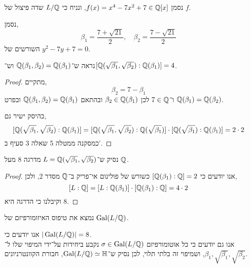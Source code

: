 \question{}
נסמן $f(x) = x^4 - 7x^2 + 7 \in \mathbb{Q}[x]$, ונניח כי $L / \mathbb{Q}$ שדה פיצול של $f$.

\subquestion{}
נסמן,
\[
	\beta_1
	= \frac{7 + \sqrt{21}}{2},
	\quad
	\beta_2
	= \frac{7 - \sqrt{21}}{2}
\]
השורשים של $y^2 - 7y + 7 = 0$.

\subquestion{}
נראה ש־$\mathbb{Q}(\beta_1, \beta_2) = \mathbb{Q}(\beta_1)$ וש־$[\mathbb{Q}(\sqrt{\beta_1}, \sqrt{\beta_2}) : \mathbb{Q}(\beta_1)] = 4$.
\begin{proof}
	מתקיים,
	\[
		\beta_2
		= 7 - \beta_1
	\]
	ו־$7 \in \mathbb{Q}$ לכן $\beta_2 \in \mathbb{Q}(\beta_1)$ ובהתאם $\mathbb{Q}(\beta_1, \beta_2) = \mathbb{Q}(\beta_1)$ ובפרט $\mathbb{Q}(\beta_1) = \mathbb{Q}(\beta_2)$.

	כהיסק ישיר גם,
	\[
		[\mathbb{Q}(\sqrt{\beta_1}, \sqrt{\beta_2}) : \mathbb{Q}(\beta_1)]
		= [\mathbb{Q}(\sqrt{\beta_1}, \sqrt{\beta_2}) : \mathbb{Q}(\sqrt{\beta_1})]
		\cdot [\mathbb{Q}(\sqrt{\beta_1}) : \mathbb{Q}(\beta_1)]
		= 2 \cdot 2
	\]
	כמסקנה ממטלה 5 שאלה 3 סעיף ב'.
\end{proof}

\subquestion{}
נסיק ש־$L = \mathbb{Q}(\sqrt{\beta_1}, \sqrt{\beta_2})$ מדרגה 8 מעל $\mathbb{Q}$.
\begin{proof}
	אנו יודעים כי $[\mathbb{Q}(\beta_1) : \mathbb{Q}] = 2$ כשורש של פולינום אי־פריק ב־$\mathbb{Q}$ מסדר 2, ולכן,
	\[
		[L : \mathbb{Q}]
		= [L : \mathbb{Q}(\beta_1)] \cdot [\mathbb{Q}(\beta_1) : \mathbb{Q}]
		= 4 \cdot 2
	\]
	וקיבלנו כי הדרגה היא $8$.
\end{proof}

\subquestion{}
נמצא את טיפוס האיזומורפיזם של $\operatorname{Gal}(L / \mathbb{Q})$.
\begin{solution}
	אנו יודעים כי $|\operatorname{Gal}(L / \mathbb{Q})| = 8$. \\
	אנו גם יודעים כי כל אוטומורפיזם $\sigma \in \operatorname{Gal}(L / \mathbb{Q})$ נקבע ביחידות על־ידי המיפוי שלו ל־$\beta_1, \sqrt{\beta_1}, \sqrt{\beta_2}$, ושמיפוי זה בלתי תלוי,
	לכן נסיק ש־$\operatorname{Gal}(L / \mathbb{Q}) \simeq \mathbb{H}$, חבורת הקוונטרניונים.
\end{solution}


